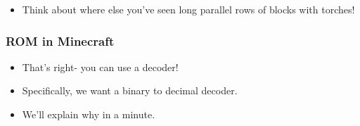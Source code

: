 \documentclass{beamer}
\begin{document}
\begin{frame}
{\begin{tikzpicture}[x=0.75pt,y=0.75pt,yscale=-1,xscale=1]
\end{tikzpicture}


             	}
             	
             	
             	\begin{itemize}
             		\item Think about where else you've seen long parallel rows of blocks with torches!
             	\end{itemize}
             	
             \end{frame}
             
             \begin{frame}
             	\frametitle{ROM in Minecraft}
             	\begin{itemize}
             		\item That's right- you can use a decoder!
             		\item Specifically, we want a binary to decimal decoder.
             		\item We'll explain why in a minute.
             		
             	\end{itemize}
             \end{frame}
             
\end{document}
